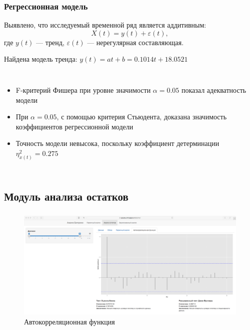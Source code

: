 \documentclass[10pt,pdf,aspectratio=169,hyperref={unicode},notheorems]{beamer}
\theoremstyle{definition}
\theoremstyle{example}
\theoremstyle{plain}
\begin{document}
\begin{frame}
  \frametitle{Регрессионная модель}
  Выявлено, что исследуемый временной ряд является аддитивным:
  \begin{equation}
    X(t) = y(t) + \varepsilon(t),
  \end{equation}
  где $ y(t) $ --- тренд, $ \varepsilon(t) $ --- нерегулярная составляющая.

  \vspace{0.2em}

  \begin{center}
    Найдена модель тренда: $ y(t) = at + b = 0.1014t + 18.0521 $
  \end{center}
  \begin{columns}[c]
  \column{3in}

  \begin{itemize}
      \item F-критерий Фишера при уровне значимости $ \alpha = 0.05 $ показал адекватность модели
      \item При $ \alpha=0.05 $, с помощью критерия Стьюдента, доказана значимость коэффициентов регрессионной модели
      \item Точность модели невысока, поскольку коэффициент детерминации $ \eta^2_{x(t)} = 0.275 $
    \end{itemize}
  \column{3in}
    
  \end{columns}
\end{frame}

\subsection{Модуль анализа остатков}

\begin{frame}
  \frametitle{\large\secname}
  \framesubtitle{\subsecname}
    \begin{figure}[h]
    \includegraphics[width=1\textwidth]{../../figures/static/3_acf.png}
    \caption{Автокорреляционная функция}
  \end{figure}
\end{frame}
\end{document}
